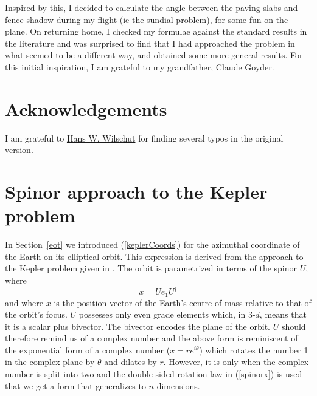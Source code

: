 \documentclass[12pt]{article}
\begin{document}
Inspired by this, I decided to calculate the angle between the paving slabs and fence shadow during my flight (ie the sundial problem), for some fun on the plane. On returning home, I checked my formulae against the standard results in the literature and was surprised to find that I had approached the problem in what seemed to be a different way, and obtained some more general results. For this initial inspiration, I am grateful to my grandfather, Claude Goyder.
%
\section*{Acknowledgements}
%
I am grateful to \href{https://sites.google.com/view/hanswilschut/home}{Hans W. Wilschut} for finding several typos in the original version.
%
\clearpage
%
\appendix 
\section{Spinor approach to the Kepler problem} \label{kepler}
%
In Section~\ref{eot} we introduced (\ref{keplerCoords}) for the azimuthal coordinate of the Earth on its elliptical orbit. This expression is derived from the approach to the Kepler problem given in \cite{GAbook}. The orbit is parametrized in terms of the spinor $U$, where
%
\begin{equation} \label{spinorx}
x = U e_1 U^\dag
\end{equation}
%
and where $x$ is the position vector of the Earth's centre of mass relative to that of the orbit's focus. $U$ possesses only even grade elements which, in 3-$d$, means that it is a scalar plus bivector. The bivector encodes the plane of the orbit. $U$ should therefore remind us of a complex number and the above form is reminiscent of the exponential form of a complex number ($x = re^{i\theta}$) which rotates the number 1 in the complex plane by $\theta$ and dilates by $r$. However, it is only when the complex number is split into two and the double-sided rotation law in (\ref{spinorx}) is used that we get a form that generalizes to $n$ dimensions.
\end{document}
